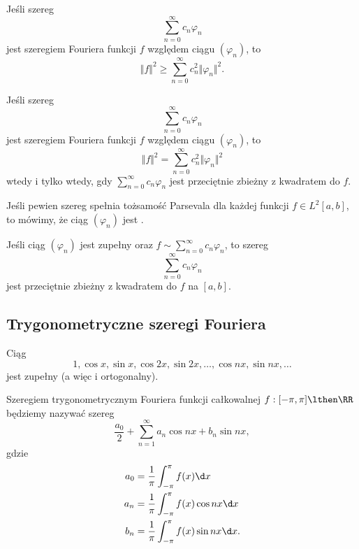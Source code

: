 \begin{theorem}
    Jeśli szereg
    \[ \sum_{n=0}^\infty c_n\varphi_n \]
    jest szeregiem Fouriera funkcji $f$ względem ciągu $(\varphi_n)$, to
    \[ \Vert f \Vert^2 \geq \sum_{n=0}^\infty c_n^2 \Vert \varphi_n \Vert^2. \]
\end{theorem}

\begin{theorem}
    Jeśli szereg
    \[ \sum_{n=0}^\infty c_n\varphi_n \]
    jest szeregiem Fouriera funkcji $f$ względem ciągu $(\varphi_n)$, to
    \[ \Vert f \Vert^2 = \sum_{n=0}^\infty c_n^2 \Vert \varphi_n \Vert^2 \]
    wtedy i tylko wtedy, gdy $\sum_{n=0}^\infty c_n\varphi_n$ jest przeciętnie zbieżny z kwadratem do $f$.
\end{theorem}

Jeśli pewien szereg spełnia tożsamość Parsevala dla każdej funkcji $f \in L^2[a, b]$, to mówimy, że ciąg $(\varphi_n)$ jest .

\begin{corollary}
    Jeśli ciąg $(\varphi_n)$ jest zupełny oraz $f \sim \sum_{n=0}^\infty c_n\varphi_n$, to szereg
    \[ \sum_{n=0}^\infty c_n\varphi_n \]
    jest przeciętnie zbieżny z kwadratem do $f$ na $[a, b]$.
\end{corollary}

\subsection{Trygonometryczne szeregi Fouriera}
\begin{fact}
    Ciąg
    \[ 1, \cos x, \sin x, \cos 2x, \sin 2x, \ldots, \cos nx, \sin nx, \ldots \]
    jest zupełny (a więc i ortogonalny).
\end{fact}

\begin{corollary}
    Szeregiem trygonometrycznym Fouriera funkcji całkowalnej $f : [-\pi, \pi] \lthen \RR$ będziemy nazywać szereg
    \[ \frac{a_0}{2} + \sum_{n=1}^\infty a_n\cos nx + b_n\sin nx, \]
    gdzie
    \begin{align*}
        a_0 &= \frac{1}{\pi}\int_{-\pi}^\pi f(x) \d x \\
        a_n &= \frac{1}{\pi}\int_{-\pi}^\pi f(x)\cos nx \d x \\
        b_n &= \frac{1}{\pi}\int_{-\pi}^\pi f(x)\sin nx \d x.
    \end{align*}
\end{corollary}

